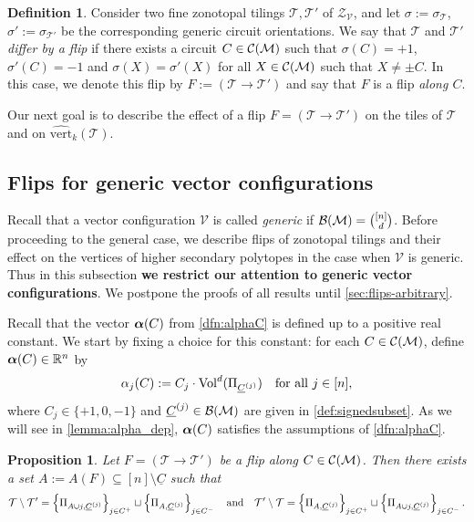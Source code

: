\documentclass[11pt]{amsart}
\theoremstyle{plain}
\newtheorem{proposition}[theorem]{Proposition}
\theoremstyle{definition}
\newtheorem{definition}[theorem]{Definition}
\def\R{\mathbb{R}}
\def\V{\mathcal{V}}
\def\Zon{\mathcal{Z}}
\def\ZV{\Zon_\V}
\def\Vol{\mathrm{Vol}}
\newcommand\wh[1]{\hstretch{2}{\hat{\hstretch{0.5}{#1}}}}
\def\vert{\mathrm{vert}}
\def\vertHSP{\wh\vert}
\def\vertHSP{\widehat{\vert}}
\def\VC{\V}
\def\Tcal{\mathcal{T}}
\def\suppC{{\underline{C}}}
\def\Tiling{\Tcal}
\def\tile{\Pi}
\def\VolX(#1){\Vol^d(\tile_{#1})}
\let\subset\subseteq
\begin{document}
\begin{definition}\label{dfn:flip}
Consider two fine zonotopal tilings $\Tiling,\Tiling'$ of $\ZV$, and let $\sigma:=\sigma_\Tiling$, $\sigma':=\sigma_{\Tiling'}$ be the corresponding generic circuit orientations. We say that $\Tiling$ and $\Tiling'$ \emph{differ by a flip} if there exists a circuit $C\in\mathcal{C}(\mathcal{M})$ such that $\sigma(C)=+1$, $\sigma'(C)=-1$ and $\sigma(X)=\sigma'(X)$ for all $X\in\mathcal{C}(\mathcal{M})$ such that $X\neq\pm C$. In this case, we denote this flip by $F:=(\Tiling\to\Tiling')$ and say that $F$ is a flip \emph{along $C$}.
\end{definition}
\noindent Our next goal is to describe the effect of a flip $F=(\Tiling\to\Tiling')$ on the tiles of $\Tiling$ and on $\vertHSP_k(\Tiling)$.

\subsection{Flips for generic vector configurations}
Recall that a vector configuration $\VC$ is called \emph{generic} if $\mathcal{B}(\mathcal{M})={[n]\choose d}$. Before proceeding to the general case, we describe flips of zonotopal tilings and their effect on the vertices of higher secondary polytopes in the case when $\VC$ is generic. Thus in this subsection \textbf{we restrict our attention to generic vector configurations}. We postpone the proofs of all results until 
\cref{sec:flips-arbitrary}.

Recall that the vector $\bm{\alpha}(C)$ from \cref{dfn:alphaC} is defined up to a positive real constant. We start by fixing a choice for this constant: for each $C\in\mathcal{C}(\mathcal{M})$, define $\alphaC\in\R^n$ by
\begin{equation}\label{eq:alphaC}
\alphaCx_j:=C_j\cdot \VolX(\sC^j)\quad\text{for all $j\in[n]$},   
\end{equation}
where $C_j\in\{+1,0,-1\}$ and $\sC^j\in \Bases$ are given in \cref{def:signedsubset}. As we will see  in \cref{lemma:alpha_dep},  $\bm{\alpha}(C)$ satisfies the assumptions of \cref{dfn:alphaC}.

\begin{proposition}\label{prop:flip_generic}
Let $F=(\Tiling\to\Tiling')$ be a flip along $C\in\mathcal{C}(\mathcal{M})$. Then there exists a set $A:=A(F)\subset [n]\setminus \suppC$ such that
\[
  \Tiling\setminus \Tiling'= \left\{\tile_{A\cup j,\sC^j}\right\}_{j\in C^+}\sqcup \left\{\tile_{A,\sC^j}\right\}_{j\in C^-} \quad\text{and}\quad 
 \Tiling'\setminus \Tiling= \left\{\tile_{A,\sC^j}\right\}_{j\in C^+}\sqcup \left\{\tile_{A\cup j,\sC^j}\right\}_{j\in C^-}.\]
\end{proposition}
\end{document}
